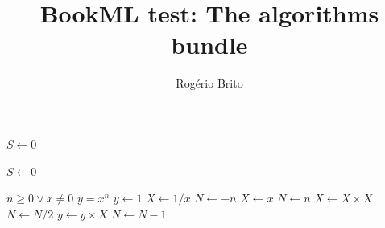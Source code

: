 \documentclass{article}
\title{BookML test: The \textsf{algorithms} bundle}
\author{Rogério Brito}
\begin{document}
\begin{algorithmic}
  \STATE $S \leftarrow 0$
\end{algorithmic}

\begin{algorithmic}[1]
  \STATE $S \leftarrow 0$
\end{algorithmic}

\begin{algorithm}
\caption{Calculate $y = x^n$}
\label{alg1}
\begin{algorithmic}
\REQUIRE $n \geq 0 \vee x \neq 0$
\ENSURE $y = x^n$
\STATE $y \leftarrow 1$
\STATE $X \leftarrow 1 / x$
\STATE $N \leftarrow -n$
\ELSE
\STATE $X \leftarrow x$
\STATE $N \leftarrow n$
\ENDIF
{}
\STATE $X \leftarrow X \times X$
\STATE $N \leftarrow N / 2$
\ELSE[$N$ is odd]
\STATE $y \leftarrow y \times X$
\STATE $N \leftarrow N - 1$
\ENDIF
\ENDWHILE
\end{algorithmic}
\end{algorithm}
\end{document}
